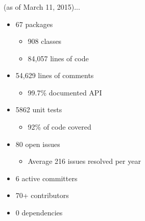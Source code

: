 \begin{frame}[fragile]
  \frametitle{}

\textbf{} (as of March 11, 2015)...

\begin{itemize}
\item 67 packages
\begin{itemize}
\item 908 classes
\item 84,057 lines of code
\end{itemize}
\item 54,629 lines of comments
\begin{itemize}
\item 99.7\% documented API
\end{itemize}
\item 5862 unit tests
\begin{itemize}
\item 92\% of code covered
\end{itemize}
\item 80 open issues
\begin{itemize}
\item Average 216 issues resolved per year
\end{itemize}
\item 6 active committers
\item 70+ contributors
\item 0 dependencies
\end{itemize}


\end{frame}
